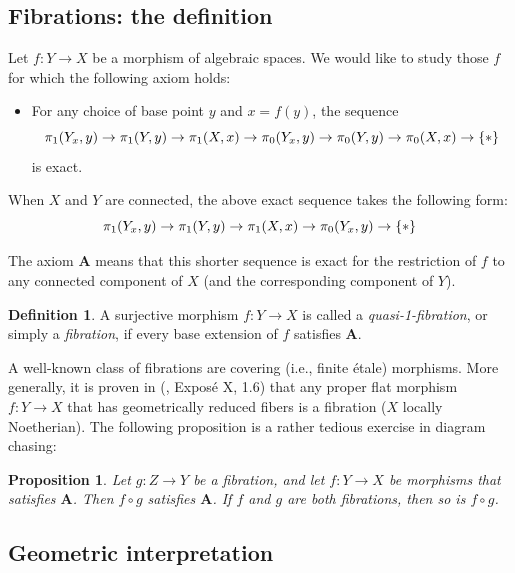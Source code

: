\documentclass{amsart}
\newtheorem{prop}[thm]{Proposition}
\theoremstyle{definition}
\newtheorem{defn}[thm]{Definition}
\theoremstyle{remark}
\theoremstyle{remark}
\newcommand{\ppXX}{\pi_1(X,x)}
\newcommand{\ppYY}{\pi_1(Y,y)}
\let\:=\colon
\begin{document}
\subsection{Fibrations: the definition}

 Let $f \: Y \to X$ be a morphism of algebraic spaces.
We would like to study those $f$ for which  the following axiom
holds:

 \begin{itemize}
\item[$\mathbf{A}$)]   For any choice of base point $y$ and $x=f(y)$, the sequence
\begin{equation}{\label{3}}
\pi_1(Y_x,y) \to \ppYY \to \ppXX \to \pi_0(Y_x,y) \to \pi_0(Y,y)
\to \pi_0(X,x) \to \{*\}
\end{equation}
 is exact.
 \end{itemize}

 When $X$ and $Y$ are connected, the above exact sequence takes the following form:
 \begin{equation}{\label{2}}
 \pi_1(Y_x,y) \to \ppYY \to \ppXX \to \pi_0(Y_x,y) \to \{*\}
 \end{equation}

The axiom $\mathbf{A}$ means that this shorter sequence is exact
for the restriction of $f$ to any connected component of $X$ (and
the corresponding component of $Y$).

\begin{defn}{\label{D:fibration}}
 A surjective morphism $f \: Y \to X$  is called a {\em quasi-1-fibration},
 or simply a {\sl fibration}, if every base extension of $f$ satisfies $\mathbf{A}$.
\end{defn}

A well-known class of  fibrations are covering (i.e., finite
\'{e}tale) morphisms. More generally, it is proven in
(\cite{SGA1}, Expos\'{e} X, 1.6) that any proper flat morphism $f
\: Y \to X$
 that has geometrically reduced fibers  is a fibration ($X$ locally Noetherian).
The following proposition is a rather tedious exercise in diagram
chasing:

\begin{prop}{\label{P:comp}}
Let $g \: Z \to Y$ be a fibration, and let $f \: Y \to X$ be
morphisms that satisfies $\mathbf{A}$.  Then $f \circ g$ satisfies
$\mathbf{A}$. If $f$ and $g$  are both fibrations, then so is $f
\circ g$.

\end{prop}

\subsection{Geometric interpretation}
\end{document}
